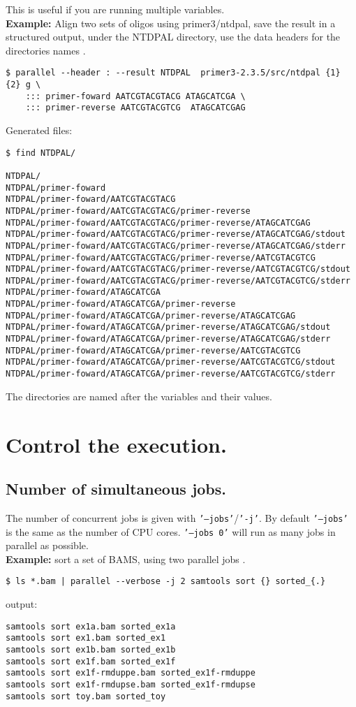 \documentclass{article}
\newcommand{\example}[1]{
\textbf{Example: } {\color[rgb]{0,0,1} #1 } .
}
\newcommand{\cmdoption}[1]{\texttt{'#1'}}
\begin{document}
This is useful if you are running multiple variables.\\
\example{Align two sets of oligos using primer3/ntdpal, save the result in a structured output, under the NTDPAL directory, use the data headers for the directories names}
\begin{lstlisting}
$ parallel --header : --result NTDPAL  primer3-2.3.5/src/ntdpal {1} {2} g \
	::: primer-foward AATCGTACGTACG ATAGCATCGA \
	::: primer-reverse AATCGTACGTCG  ATAGCATCGAG
\end{lstlisting}
Generated files:
\begin{lstlisting}
$ find NTDPAL/

NTDPAL/
NTDPAL/primer-foward
NTDPAL/primer-foward/AATCGTACGTACG
NTDPAL/primer-foward/AATCGTACGTACG/primer-reverse
NTDPAL/primer-foward/AATCGTACGTACG/primer-reverse/ATAGCATCGAG
NTDPAL/primer-foward/AATCGTACGTACG/primer-reverse/ATAGCATCGAG/stdout
NTDPAL/primer-foward/AATCGTACGTACG/primer-reverse/ATAGCATCGAG/stderr
NTDPAL/primer-foward/AATCGTACGTACG/primer-reverse/AATCGTACGTCG
NTDPAL/primer-foward/AATCGTACGTACG/primer-reverse/AATCGTACGTCG/stdout
NTDPAL/primer-foward/AATCGTACGTACG/primer-reverse/AATCGTACGTCG/stderr
NTDPAL/primer-foward/ATAGCATCGA
NTDPAL/primer-foward/ATAGCATCGA/primer-reverse
NTDPAL/primer-foward/ATAGCATCGA/primer-reverse/ATAGCATCGAG
NTDPAL/primer-foward/ATAGCATCGA/primer-reverse/ATAGCATCGAG/stdout
NTDPAL/primer-foward/ATAGCATCGA/primer-reverse/ATAGCATCGAG/stderr
NTDPAL/primer-foward/ATAGCATCGA/primer-reverse/AATCGTACGTCG
NTDPAL/primer-foward/ATAGCATCGA/primer-reverse/AATCGTACGTCG/stdout
NTDPAL/primer-foward/ATAGCATCGA/primer-reverse/AATCGTACGTCG/stderr
\end{lstlisting}
The directories are named after the variables and their values.
\section{Control the execution.}
\subsection{Number of simultaneous jobs.}
The number of concurrent jobs is given with \cmdoption{--jobs}/\cmdoption{-j}. By default \cmdoption{--jobs} is the same as the number of CPU cores. \cmdoption{--jobs 0} will run as many jobs in parallel as possible.\\
\example{sort a set of BAMS, using two parallel jobs}
\begin{lstlisting}
$ ls *.bam | parallel --verbose -j 2 samtools sort {} sorted_{.}
\end{lstlisting}
output:
\begin{lstlisting}
samtools sort ex1a.bam sorted_ex1a
samtools sort ex1.bam sorted_ex1
samtools sort ex1b.bam sorted_ex1b
samtools sort ex1f.bam sorted_ex1f
samtools sort ex1f-rmduppe.bam sorted_ex1f-rmduppe
samtools sort ex1f-rmdupse.bam sorted_ex1f-rmdupse
samtools sort toy.bam sorted_toy
\end{lstlisting}
\end{document}
